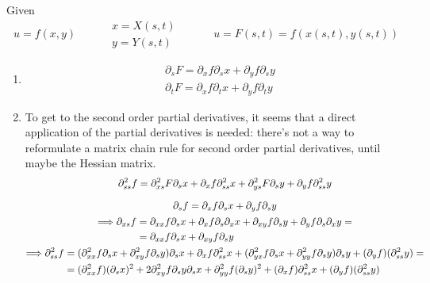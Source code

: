 \documentclass[twoside]{amsart}
\theoremstyle{plain}
\theoremstyle{definition}
\newcommand{\exercisehead}[1]
  {
   \noindent{\small\bf Exercise #1.}
   \smallskip}
\begin{document}
\exercisehead{3} Given 
\[
u = f(x,y) \quad \quad 
\begin{aligned}
  & x = X(s,t) \\
  & y = Y(s,t)
\end{aligned} \quad \quad \quad u = F(s,t) = f(x(s,t),y(s,t))
\]
\begin{enumerate}
\item \[
\begin{aligned}
  & \partial_s F = \partial_x f \partial_s x + \partial_y f \partial_s y \\
  & \partial_t F = \partial_x f \partial_t x + \partial_y f \partial_t y
\end{aligned}
\]
\item To get to the second order partial derivatives, it seems that a direct application of the partial derivatives is needed: there's not a way to reformulate a matrix chain rule for second order partial derivatives, until maybe the Hessian matrix.  
\[
\begin{gathered}
  \partial_{ss}^2 f  = \partial^2_{xs} F \partial_s x + \partial_x f \partial_{ss}^2 x + \partial_{ys}^2 F \partial_s y + \partial_y f \partial_{ss}^2 y  \medskip \\
  \begin{gathered}
    \partial_s f  = \partial_x f \partial_s x + \partial_y f \partial_s y  \\
    \begin{aligned}
      \Longrightarrow \partial_{xs} f & = \partial_{xx} f \partial_s x + \partial_x f \partial_s \partial_x x + \partial_{xy} f \partial_s y + \partial_y f \partial_s \partial_x y = \\
      & = \partial_{xx} f \partial_s x + \partial_{xy} f \partial_s y 
    \end{aligned} 
  \end{gathered} \\
\begin{aligned}
  \Longrightarrow \partial_{ss}^2 f & = (\partial_{xx}^2 f \partial_s x + \partial_{xy}^2 f \partial_s y) \partial_s x + \partial_x f \partial_{ss}^2 x + (\partial_{yx}^2 f \partial_s x + \partial_{yy}^2 f \partial_s y)\partial_s y + (\partial_y f)(\partial_{ss}^2 y) = \\ 
  & = (\partial_{xx}^2 f)(\partial_s x)^2 + 2\partial_{xy}^2 f \partial_s y \partial_s x + \partial_{yy}^2 f (\partial_s y)^2 + (\partial_x f) \partial_{ss}^2 x + (\partial_y f)(\partial_{ss}^2 y )
\end{aligned}
\end{gathered}
\]
\end{enumerate}
\end{document}
